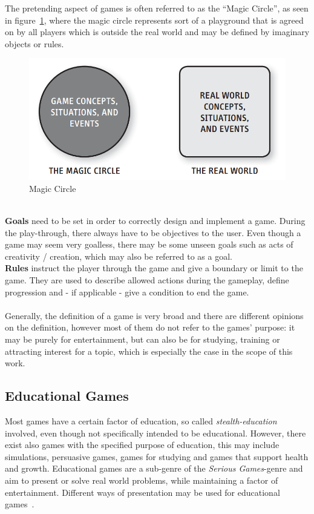 The pretending aspect of games is often referred to as the ``Magic Circle'', as seen in figure~\ref{fig:magic-circle}, where the magic circle represents sort of a
playground that is agreed on by all players which is outside the real world and may be defined by imaginary objects or rules.
\begin{figure}
    \centering
    \includegraphics[width=\textwidth]{./Pictures/res/fundamentals/magic-circle}
    \caption{Magic Circle \cite{10.5555/2544002}}
    \label{fig:magic-circle}
\end{figure}
\\
\textbf{Goals} need to be set in order to correctly design and implement a game.
During the play-through, there always have to be objectives to the user.
Even though a game may seem very goalless, there may be some unseen goals such as acts of creativity / creation, which may also be
referred to as a goal.
\\
\textbf{Rules} instruct the player through the game and give a boundary or limit to the game.
They are used to describe allowed actions during the gameplay, define progression and - if applicable - give a condition to
end the game.
\\ \\
Generally, the definition of a game is very broad and there are different opinions on the definition, however most of them
do not refer to the games' purpose: it may be purely for entertainment, but can also be for studying, training or attracting interest
for a topic, which is especially the case in the scope of this work.

\subsection{Educational Games}\label{subsec:educational-games}
Most games have a certain factor of education, so called \textit{stealth-education} involved, even though not
specifically intended to be educational.
However, there exist also games with the specified purpose of education, this may include simulations, persuasive games,
games for studying and games that support health and growth.
Educational games are a sub-genre of the \textit{Serious Games}-genre and aim to present or solve real world problems,
while maintaining a factor of entertainment.
Different ways of presentation may be used for educational games~\cite[p.43]{10.5555/2544002}.

